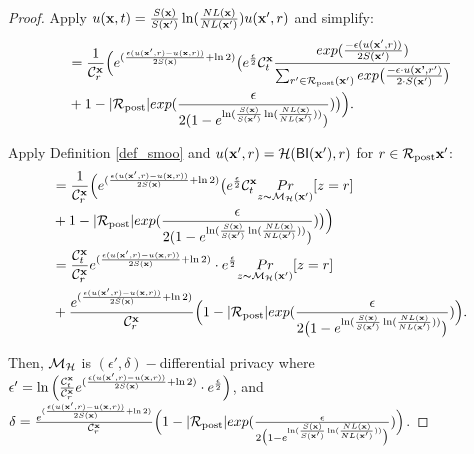 \documentclass{article}
\begin{document}
\begin{proof}
      Apply $u(\textbf{x}, {t}) = \frac{S(\textbf{x})}{S(\textbf{x}')} \ln(\frac{NL(\textbf{x})}{NL(\textbf{x}')}) u(\textbf{x}', {r})$ and simplify:\\
      \begin{equation*}
      \begin{split}          
      & = \frac{1}{\mathcal{C}^{\textbf{x}}_{r}} \Big( e^{(\frac{\epsilon (u(\textbf{x}', {r}) - u(\textbf{x}, {r}))}{2 S(\textbf{x})} + \ln 2)} 
      \big( e^{\frac{\epsilon}{2}}
      \mathcal{C}^{\textbf{x}}_{t} \frac{exp(\frac{-\epsilon (u(\textbf{x}', {r}))}{2 S(\textbf{x}')})}{\sum_{r'\in \mathcal{R}_{\textup{post}}(\textbf{x}')} exp \big(\frac{-\epsilon\cdot u(\textbf{\textbf{x}'}, r')}{2 \cdot S(\textbf{x}')}\big)}\\
      & + 1 - |\mathcal{R}_{\textup{post}}|exp(\frac{\epsilon}{2 (1 - e ^ {\ln(\frac{S(\textbf{x})}{S(\textbf{x}')} \ln(\frac{NL(\textbf{x})}{NL(\textbf{x}')}))})}) 
      \big ) \Big).
       \end{split}
      \end{equation*}

      Apply Definition \ref{def_smoo} and $u(\textbf{x}', {r}) = \mathcal{H}(\mathsf{BI}(\textbf{x}'),r)$ for $r \in \mathcal{R}_{\textup{post}}{\textbf{x}'}$:\\
      \begin{equation*}
      \begin{split}          
      & = \frac{1}{\mathcal{C}^{\textbf{x}}_{r}} \Big( e^{(\frac{\epsilon (u(\textbf{x}', {r}) - u(\textbf{x}, {r}))}{2 S(\textbf{x})} + \ln 2)} 
      \big( e^{\frac{\epsilon}{2}}
      \mathcal{C}^{\textbf{x}}_{t}  \underset{z \thicksim \mathcal{M}_{\mathcal{H}}(\textbf{x}')}{Pr}[z = r] \\
      & + 1 - |\mathcal{R}_{\textup{post}}|exp(\frac{\epsilon}{2 (1 - e ^ {\ln(\frac{S(\textbf{x})}{S(\textbf{x}')} \ln(\frac{NL(\textbf{x})}{NL(\textbf{x}')}))})}) 
      \big ) \Big)\\
      & = \frac{\mathcal{C}^{\textbf{x}}_{t}}{\mathcal{C}^{\textbf{x}}_{r}} e^{(\frac{\epsilon (u(\textbf{x}', {r}) - u(\textbf{x}, {r}))}{2 S(\textbf{x})} + \ln 2)} \cdot e^{\frac{\epsilon}{2}}
      \underset{z \thicksim \mathcal{M}_{\mathcal{H}}(\textbf{x}')}{Pr}[z = r] \\
      & + \frac{e^{(\frac{\epsilon (u(\textbf{x}', {r}) - u(\textbf{x}, {r}))}{2 S(\textbf{x})} + \ln 2)}}{\mathcal{C}^{\textbf{x}}_{r}}
      \Big( 1 - |\mathcal{R}_{\textup{post}}|exp(\frac{\epsilon}{2 \big( 1 - e ^ {\ln(\frac{S(\textbf{x})}{S(\textbf{x}')} \ln(\frac{NL(\textbf{x})}{NL(\textbf{x}')}))} \big) }) \Big).
      \end{split}
      \end{equation*}

      Then, $\mathcal{M}_{\mathcal{H}}$ is $(\epsilon', \delta)-$differential privacy where $\epsilon' = \ln \Big( \frac{\mathcal{C}^{\textbf{x}}_{t}}{\mathcal{C}^{\textbf{x}}_{r}} e^{(\frac{\epsilon (u(\textbf{x}', {r}) - u(\textbf{x}, {r}))}{2 S(\textbf{x})} + \ln 2)} \cdot e^{\frac{\epsilon}{2}} \Big)$, and
      $\delta = \frac{e^{(\frac{\epsilon (u(\textbf{x}', {r}) - u(\textbf{x}, {r}))}{2 S(\textbf{x})} + \ln 2)}}{\mathcal{C}^{\textbf{x}}_{r}}
      \Big( 1 - |\mathcal{R}_{\textup{post}}|exp(\frac{\epsilon}{2 \big(1 - e ^ {\ln(\frac{S(\textbf{x})}{S(\textbf{x}')} \ln(\frac{NL(\textbf{x})}{NL(\textbf{x}')}))}\big)}) \Big)$.



\end{proof}
\end{document}
